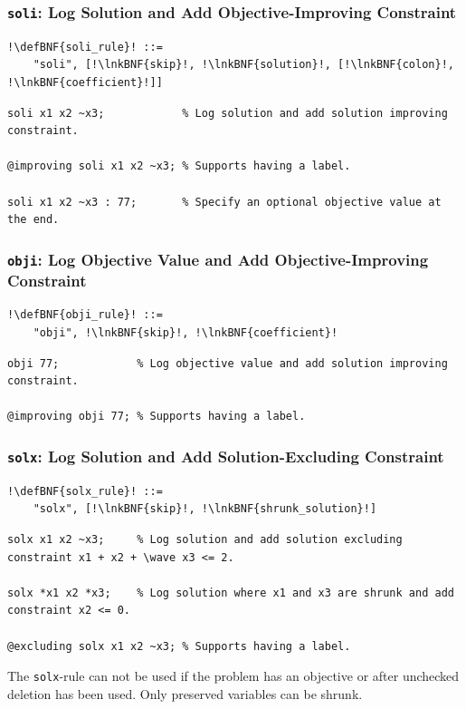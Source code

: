 \documentclass[a4paper]{article}
\newcommand{\defBNF}[1]{\hypertarget{def:#1}{<\detokenize{#1}>}}
\newcommand{\lnkBNF}[1]{\hyperlink{def:#1}{<\detokenize{#1}>}}
\newcommand{\wave}[0]{\raisebox{0.5ex}{\texttildelow}}
\begin{document}
\subsubsection{\texttt{soli}: Log Solution and Add Objective-Improving Constraint}\label{sec:rules-soli}
\begin{lstlisting}
!\defBNF{soli_rule}! ::=
	"soli", [!\lnkBNF{skip}!, !\lnkBNF{solution}!, [!\lnkBNF{colon}!, !\lnkBNF{coefficient}!]]
\end{lstlisting}
\begin{lstlisting}[language=veripb]
soli x1 x2 ~x3;            % Log solution and add solution improving constraint.

@improving soli x1 x2 ~x3; % Supports having a label.

soli x1 x2 ~x3 : 77;       % Specify an optional objective value at the end.
\end{lstlisting}


\subsubsection{\texttt{obji}: Log Objective Value and Add Objective-Improving Constraint}\label{sec:rules-obji}
\begin{lstlisting}
!\defBNF{obji_rule}! ::=
	"obji", !\lnkBNF{skip}!, !\lnkBNF{coefficient}!
\end{lstlisting}
\begin{lstlisting}[language=veripb]
obji 77;            % Log objective value and add solution improving constraint.

@improving obji 77; % Supports having a label.
\end{lstlisting}


\subsubsection{\texttt{solx}: Log Solution and Add Solution-Excluding Constraint}\label{sec:rules-solx}
\begin{lstlisting}
!\defBNF{solx_rule}! ::=
	"solx", [!\lnkBNF{skip}!, !\lnkBNF{shrunk_solution}!]
\end{lstlisting}
\begin{lstlisting}[language=veripb]
solx x1 x2 ~x3;     % Log solution and add solution excluding constraint x1 + x2 + \wave x3 <= 2.

solx *x1 x2 *x3;    % Log solution where x1 and x3 are shrunk and add constraint x2 <= 0.

@excluding solx x1 x2 ~x3; % Supports having a label.
\end{lstlisting}
The \verb!solx!-rule can not be used if the problem has an objective or after unchecked deletion has been used. Only preserved variables can be shrunk.
\end{document}
